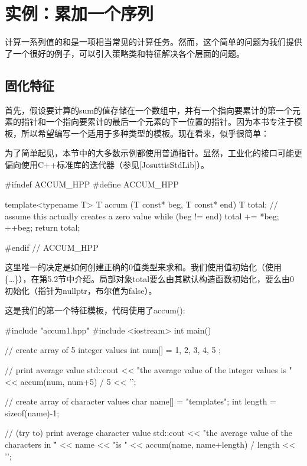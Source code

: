 \section{实例：累加一个序列}

计算一系列值的和是一项相当常见的计算任务。然而，这个简单的问题为我们提供了一个很好的例子，可以引入策略类和特征解决各个层面的问题。

\subsection{固化特征}

首先，假设要计算的sum的值存储在一个数组中，并有一个指向要累计的第一个元素的指针和一个指向要累计的最后一个元素的下一位置的指针。因为本书专注于模板，所以希望编写一个适用于多种类型的模板。现在看来，似乎很简单：

\begin{notice}
为了简单起见，本节中的大多数示例都使用普通指针。显然，工业化的接口可能更偏向使用C++标准库的迭代器（参见[JosuttisStdLib]）。
\end{notice}

\begin{cpp}
#ifndef ACCUM_HPP
#define ACCUM_HPP

template<typename T>
T accum (T const* beg, T const* end)
{
	T total{}; // assume this actually creates a zero value
	while (beg != end) {
		total += *beg;
		++beg;
	}
	return total;
}

#endif // ACCUM_HPP
\end{cpp}

这里唯一的决定是如何创建正确的0值类型来求和。我们使用值初始化（使用\{…\}），在第5.2节中介绍。局部对象total要么由其默认构造函数初始化，要么由0初始化（指针为nullptr，布尔值为false）。

这是我们的第一个特征模板，代码使用了accum():

\begin{cpp}
#include "accum1.hpp"
#include <iostream>
int main()
{
	// create array of 5 integer values
	int num[] = { 1, 2, 3, 4, 5 };
	
	// print average value
	std::cout << "the average value of the integer values is "
			  << accum(num, num+5) / 5
			  << '\n';
			  
	// create array of character values
	char name[] = "templates";
	int length = sizeof(name)-1;
	
	// (try to) print average character value
	std::cout << "the average value of the characters in \""
			  << name << "\" is "
			  << accum(name, name+length) / length
			  << '\n';
}
\end{cpp}

